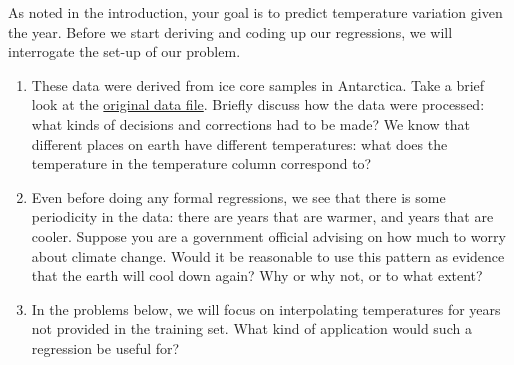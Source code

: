 \documentclass[submit]{harvardml}
\begin{document}
\begin{problem}
As noted in the introduction, your goal is to predict temperature
variation given the year.  Before we start deriving and coding up our
regressions, we will interrogate the set-up of our problem.  

\begin{enumerate}
  \item These data were derived from ice core samples in Antarctica.
    Take a brief look at the
    \href{https://www.ncei.noaa.gov/pub/data/paleo/icecore/antarctica/epica_domec/edc3deuttemp2007.txt}{original
      data file}.  Briefly discuss how the data were processed: what kinds of
    decisions and corrections had to be made?  We know that different
    places on earth have different temperatures: what does the
    temperature in the temperature column correspond to?
        
  \item Even before doing any formal regressions, we see that there is
    some periodicity in the data: there are years that are warmer, and
    years that are cooler.  Suppose you are a government official
    advising on how much to worry about climate change.  Would it be
    reasonable to use this pattern as evidence that the earth will
    cool down again?  Why or why not, or to what extent?


  \item In the problems below, we will focus on interpolating
    temperatures for years not provided in the training set.  What
    kind of application would such a regression be useful for? 

\end{enumerate}
  
\end{problem}
\end{document}
